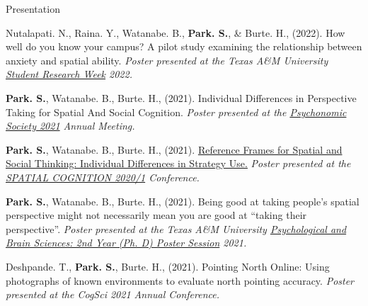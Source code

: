 \documentclass{resume} %
\begin{document}
\begin{rSection}{Presentation}
\begin{hangingpar}
	\end{hangingpar}
	
	\begin{hangingpar}
		
		Nutalapati. N., Raina. Y., Watanabe. B., \textbf{Park. S.}, \& Burte. 
		H., (2022). 
		How well do you know your campus? A pilot study examining the 
		relationship between anxiety and spatial ability. 
		\em{Poster presented at the Texas A\&M University
			\href{https://srw.tamu.edu/}{Student Research Week} 2022.}
		
	\end{hangingpar}
	
	\begin{hangingpar}
		
		\textbf{Park. S.}, Watanabe. B., Burte. H., (2021). 
		Individual Differences in Perspective Taking for Spatial And Social Cognition. 
		\em{Poster presented at the
			\href{https://www.psychonomic.org/page/2021annualmeeting}{Psychonomic Society 2021} Annual Meeting.}
		
	\end{hangingpar}
	
	\begin{hangingpar}
		
		\textbf{Park. S.}, Watanabe. B., Burte. H., (2021). 
		\href{https://sc2020.lu.lv/wp-content/uploads/2021/08/spatialCog21Poster_SungjoonParkV2.pdf}{Reference Frames for Spatial and Social Thinking: 
			Individual Differences in Strategy Use.} 
		\em{Poster presented at the 
			\href{http://sc2020.lu.lv/}{SPATIAL COGNITION 2020/1} Conference.}
		
	\end{hangingpar}
	
	\begin{hangingpar}
		
		\textbf{Park. S.}, Watanabe. B., Burte. H., (2021). 
		Being good at taking people's spatial perspective might not necessarily 
		mean you are good at “taking their perspective”. 
		\em{Poster presented at the Texas A\&M University
			\href{https://sites.google.com/tamu.edu/2021-2nd-year-poster/home}{Psychological
				and Brain Sciences: 2nd Year (Ph. D) Poster Session} 2021.}
		
	\end{hangingpar}
	
	\begin{hangingpar}
		
		Deshpande. T., \textbf{Park. S.}, Burte. H., (2021). 
		Pointing North Online: Using photographs of known environments to 
		evaluate north pointing accuracy. 
		\em{Poster presented at the CogSci 2021 Annual Conference.}
		

\end{hangingpar}
\end{rSection}
\end{document}
